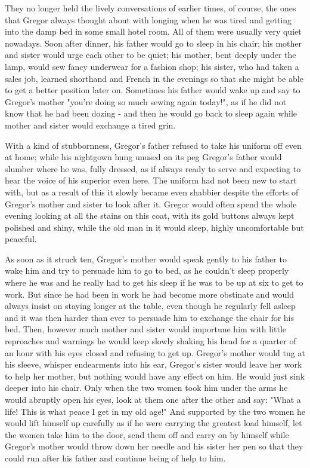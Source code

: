 \documentclass[12pt]{book}
\begin{document}
    They no longer held the lively conversations of earlier times, of course, the ones that Gregor always thought about with longing when he was tired and getting into the damp bed in some small hotel room. All of them were usually very quiet nowadays. Soon after dinner, his father would go to sleep in his chair; his mother and sister would urge each other to be quiet; his mother, bent deeply under the lamp, would sew fancy underwear for a fashion shop; his sister, who had taken a sales job, learned shorthand and French in the evenings so that she might be able to get a better position later on. Sometimes his father would wake up and say to Gregor's mother "you're doing so much sewing again today!", as if he did not know that he had been dozing - and then he would go back to sleep again while mother and sister would exchange a tired grin.

    With a kind of stubbornness, Gregor's father refused to take his uniform off even at home; while his nightgown hung unused on its peg Gregor's father would slumber where he was, fully dressed, as if always ready to serve and expecting to hear the voice of his superior even here. The uniform had not been new to start with, but as a result of this it slowly became even shabbier despite the efforts of Gregor's mother and sister to look after it. Gregor would often spend the whole evening looking at all the stains on this coat, with its gold buttons always kept polished and shiny, while the old man in it would sleep, highly uncomfortable but peaceful.

    As soon as it struck ten, Gregor's mother would speak gently to his father to wake him and try to persuade him to go to bed, as he couldn't sleep properly where he was and he really had to get his sleep if he was to be up at six to get to work. But since he had been in work he had become more obstinate and would always insist on staying longer at the table, even though he regularly fell asleep and it was then harder than ever to persuade him to exchange the chair for his bed. Then, however much mother and sister would importune him with little reproaches and warnings he would keep slowly shaking his head for a quarter of an hour with his eyes closed and refusing to get up. Gregor's mother would tug at his sleeve, whisper endearments into his ear, Gregor's sister would leave her work to help her mother, but nothing would have any effect on him. He would just sink deeper into his chair. Only when the two women took him under the arms he would abruptly open his eyes, look at them one after the other and say: "What a life! This is what peace I get in my old age!" And supported by the two women he would lift himself up carefully as if he were carrying the greatest load himself, let the women take him to the door, send them off and carry on by himself while Gregor's mother would throw down her needle and his sister her pen so that they could run after his father and continue being of help to him.
\end{document}
